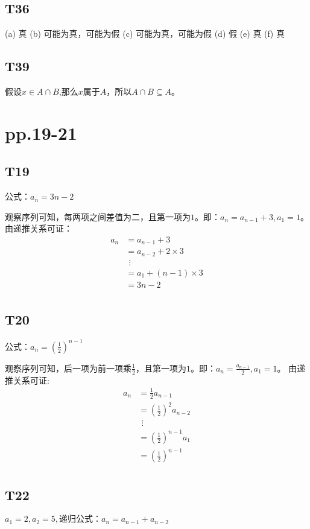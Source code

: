\documentclass{article}
\begin{document}
\subsection{T36}
(a) 真 \quad (b) 可能为真，可能为假 \quad (c) 可能为真，可能为假 \quad (d) 假 \quad
(e) 真 \quad (f) 真

\subsection{T39}
假设$x \in A \cap B$,那么$x$属于$A$，所以$A \cap B \subseteq A$。

\section{pp.19-21}
\subsection{T19}
公式：$a_n = 3n - 2$

观察序列可知，每两项之间差值为二，且第一项为$1$。即：$a_n = a_{n - 1} + 3, a_1 = 1$。
由递推关系可证：
\begin{align*}
    a_n &= a_{n - 1} + 3\\
    &= a_{n - 2} + 2 \times 3\\
    &\ \,\vdots\\
    &= a_1 + (n - 1) \times 3\\
    &= 3n - 2\\
\end{align*}

\subsection{T20}
公式：$a_n = (\frac{1}{2})^{n - 1}$

观察序列可知，后一项为前一项乘$\frac{1}{2}$，且第一项为$1$。即：$a_n = \frac{a_{n-1}}{2}, a_1 = 1$。
由递推关系可证:
\begin{align*}
    a_n &= \frac{1}{2} a_{n - 1}\\
    &= (\frac{1}{2})^2 a_{n - 2}\\
    &\ \, \vdots\\
    &= (\frac{1}{2})^{n - 1} a_1\\
    &= (\frac{1}{2})^{n - 1}\\
\end{align*}

\subsection{T22}
$a_1 = 2, a_2 = 5, \text{递归公式：}a_n = a_{n-1} + a_{n-2}$
\end{document}
